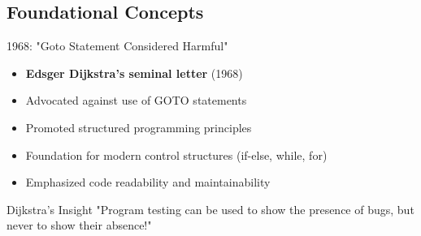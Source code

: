 \documentclass{beamer}
\begin{document}
\subsection{Foundational Concepts}

\begin{frame}[t]{1968: "Goto Statement Considered Harmful"}
\begin{itemize}
    \item \textbf{Edsger Dijkstra's seminal letter} (1968)
    \item Advocated against use of GOTO statements
    \item Promoted structured programming principles
    \item Foundation for modern control structures (if-else, while, for)
    \item Emphasized code readability and maintainability
\end{itemize}
\begin{block}{Dijkstra's Insight}
"Program testing can be used to show the presence of bugs, but never to show their absence!"
\end{block}
\end{frame}
\end{document}
